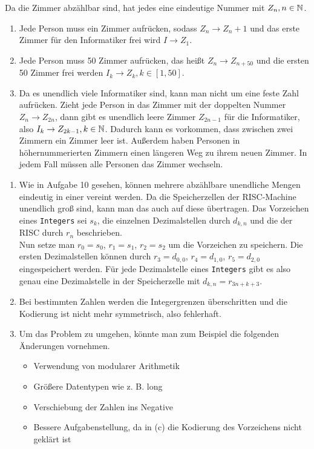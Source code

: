 \documentclass[a4paper,11pt]{article}             %
\begin{document}
Da die Zimmer abzählbar sind, hat jedes eine eindeutige Nummer mit $Z_n, n\in \mathbb{N}$.
\begin{enumerate}
\item %
Jede Person muss ein Zimmer aufrücken, sodass $Z_n \rightarrow Z_n+1$ und das erste Zimmer für den Informatiker frei wird $I \rightarrow Z_1$.
\item %
Jede Person muss 50 Zimmer aufrücken, das heißt $Z_n \rightarrow Z_{n+50}$ und die ersten 50 Zimmer frei werden $I_k \rightarrow Z_k, k\in[1,50]$.
\item %
Da es unendlich viele Informatiker sind, kann man nicht um eine feste Zahl aufrücken. Zieht jede Person in das Zimmer mit der doppelten Nummer $Z_n \rightarrow Z_{2n}$, dann gibt es unendlich leere Zimmer $Z_{2n-1}$ für die Informatiker, also $I_k \rightarrow Z_{2k-1}, k\in\mathbb{N}$. Dadurch kann es vorkommen, dass zwischen zwei Zimmern ein Zimmer leer ist. Außerdem haben Personen in höhernummerierten Zimmern einen längeren Weg zu ihrem neuen Zimmer. In jedem Fall müssen alle Personen das Zimmer wechseln.
\end{enumerate}

\begin{enumerate}
\item %
Wie in Aufgabe 10 gesehen, können mehrere abzählbare unendliche Mengen eindeutig in einer vereint werden. Da die Speicherzellen der RISC-Machine unendlich groß sind, kann man das auch auf diese übertragen. Das Vorzeichen eines \texttt{Integers} sei $s_k$, die einzelnen Dezimalstellen durch $d_{k,n}$ und die der RISC durch $r_n$ beschrieben.\\
Nun setze man $r_0 = s_0$, $r_1 = s_1$, $r_2 = s_2$ um die Vorzeichen zu speichern. Die ersten Dezimalstellen können durch $r_3 = d_{0,0}$, $r_4 = d_{1,0}$, $r_5 = d_{2,0}$ eingespeichert werden. Für jede Dezimalstelle eines \texttt{Integers} gibt es also genau eine Dezimalstelle in der Speicherzelle mit $d_{k, n} = r_{3n+k+3}$.

\setcounter{enumi}{2}
\item %
Bei bestimmten Zahlen werden die Integergrenzen überschritten und die Kodierung ist nicht mehr symmetrisch, also fehlerhaft.

\item %
Um das Problem zu umgehen, könnte man zum Beispiel die folgenden Änderungen vornehmen.
\begin{itemize}
\item Verwendung von modularer Arithmetik
\item Größere Datentypen wie z. B. long
\item Verschiebung der Zahlen ins Negative
\item Bessere Aufgabenstellung, da in (c) die Kodierung des Vorzeichens nicht geklärt ist
\end{itemize}
\end{enumerate}
\end{document}
